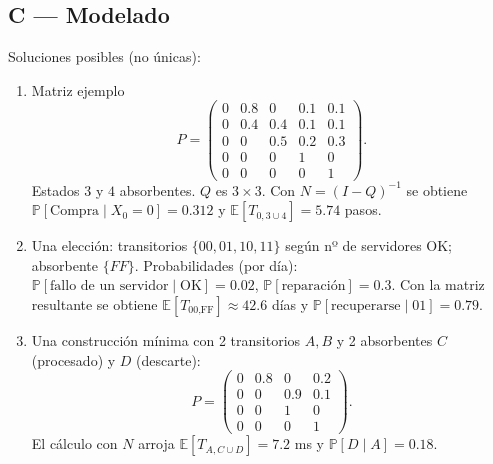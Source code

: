 \documentclass[11pt,spanish]{article}
\newcommand{\E}{\mathbb{E}}
\newcommand{\Prob}{\mathbb{P}}
\begin{document}
\subsection*{C — Modelado}
Soluciones posibles (no únicas):

\begin{enumerate}[label=\textbf{C.\arabic*}]
  \item Matriz ejemplo  
        \[
          P=\begin{pmatrix}
                0   & 0.8 & 0   & 0.1 & 0.1\\
                0   & 0.4 & 0.4 & 0.1 & 0.1\\
                0   & 0   & 0.5 & 0.2 & 0.3\\
                0   & 0   & 0   & 1   & 0\\
                0   & 0   & 0   & 0   & 1
             \end{pmatrix}.
        \]
        Estados \(3\) y \(4\) absorbentes.  
        \(Q\) es \(3\times3\).  Con \(N=(I-Q)^{-1}\) se obtiene
        \(\Prob[\text{Compra}\mid X_0=0]=0.312\) y
        \(\E[T_{0,3\cup4}]=5.74\) pasos.

  \item Una elección:  
        transitorios \(\{00,01,10,11\}\) según nº de servidores OK; absorbente \(\{FF\}\).  
        Probabilidades (por día):  
        \(\Prob[\text{fallo de un servidor}\mid \text{OK}]=0.02\),
        \(\Prob[\text{reparación}]=0.3\).  
        Con la matriz resultante se obtiene
        \(\E[T_{\text{00},\text{FF}}]\approx42.6\) días y
        \(\Prob[\text{recuperarse}\mid01]=0.79\).

  \item Una construcción mínima con 2 transitorios \(A,B\) y 2 absorbentes \(C\) (procesado) y \(D\) (descarte):
        \[
          P=\begin{pmatrix}
               0   & 0.8 & 0   & 0.2\\
               0   & 0   & 0.9 & 0.1\\
               0   & 0   & 1   & 0  \\
               0   & 0   & 0   & 1
            \end{pmatrix}.
        \]
        El cálculo con \(N\) arroja
        \(\E[T_{A,C\cup D}]=7.2\) ms y
        \(\Prob[D\mid A]=0.18\).
\end{enumerate}
\end{document}
